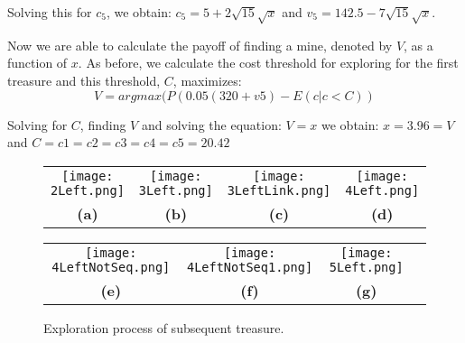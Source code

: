 Solving this for $c_5$, we obtain: $c_5=5+2\sqrt{15}\sqrt{x}$ and $v_5=142.5-7\sqrt{15}\sqrt{x}$.

Now we are able to calculate the payoff of finding a mine, denoted by $V$, as a function of $x$. As before, we calculate the cost threshold for exploring for the first treasure and this threshold, $C$, maximizes: $$V=argmax(P (0.05(320+v5)-E(c|c<C))$$

Solving for $C$, finding $V$ and solving the equation: $V=x$ we obtain:
$x=3.96=V$ and $C=c1=c2=c3=c4=c5=20.42$

\begin{figure} [!ht]
\centering
\begin{tabular}{cccc}
\texttt{[image: 2Left.png]} 
\label{fig:2Left}&
\texttt{[image: 3Left.png]}
\label{fig:3 left.a}&
\texttt{[image: 3LeftLink.png]} 
\label{fig:3 left.b}&
\texttt{[image: 4Left.png]}
\label{fig:4 left.a}\\
\textbf{(a)}  & \textbf{(b)} & \textbf{(c)} & \textbf{(d)} \\[6pt]
\end{tabular}
\begin{tabular}{cccc}
\texttt{[image: 4LeftNotSeq.png]} 
\label{fig:4 left.b}&
\texttt{[image: 4LeftNotSeq1.png]}
 \label{fig:4 left.c}&
\texttt{[image: 5Left.png]}
 \label{fig:5 left}\\
\textbf{(e)}  & \textbf{(f)} & \textbf{(g)} \\[6pt]
\end{tabular}
\caption{Exploration process of subsequent treasure.}
\label{fig:expprocces}
\end{figure}


